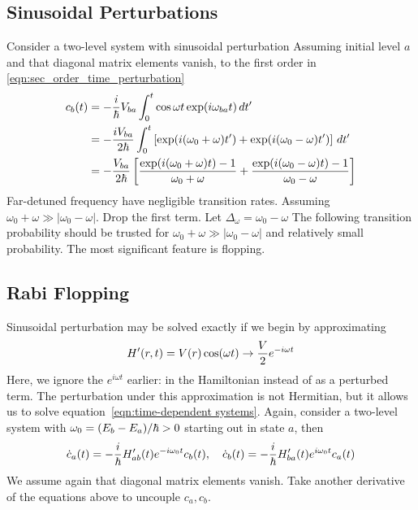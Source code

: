 \subsection{Sinusoidal Perturbations}
Consider a two-level system with sinusoidal perturbation 
Assuming initial level $a$ and that diagonal matrix elements vanish, to 
the first order in \ref{eqn:sec_order_time_perturbation}
\[\begin{aligned}
    c_b(t) 
    &= -\dfrac i {\hbar} V_{ba}\int_0^t \cos\omega t \exp(i\omega_{ba}t)\, dt'\\ 
    &= -\dfrac {i V_{ba}}{2\hbar} \int_0^t \left[\exp(i(\omega_0 + \omega) t') + \exp(i(\omega_0 - \omega)t')\right]\, dt' \\ 
    &= -\dfrac {V_{ba}}{2\hbar}\left[\dfrac{\exp(i(\omega_0 + \omega)t) - 1}{\omega_0 + \omega} + \dfrac{\exp(i(\omega_0 - \omega)t) - 1}{\omega_0 - \omega}\right]
\end{aligned}\] 
Far-detuned frequency have negligible transition rates. Assuming $\omega_0 + \omega \gg |\omega_0 - \omega|$. 
Drop the first term. Let $\Delta_\omega = \omega_0 - \omega$ 
The following transition probability should be trusted for $\omega_0 + \omega \gg |\omega_0 - \omega|$ and 
relatively small probability. The most significant feature is flopping. 
\subsection{Rabi Flopping}
Sinusoidal perturbation may be solved exactly if we begin by approximating 
\[ 
    H'(r, t) = V(r)\cos(\omega t) \to \dfrac V 2 e^{-i\omega t}
\] 
Here, we ignore the $e^{i\omega t}$ earlier: in the Hamiltonian instead of as a perturbed term. 
The perturbation under this approximation is not Hermitian, but it allows us to solve 
equation~\ref{eqn:time-dependent systems}. 
Again, consider a two-level system with 
$\omega_0 = (E_b - E_a)/\hbar>0$ starting out in state $a$, then 
\[
    \dot c_a(t) = -\dfrac i {\hbar} H'_{ab}(t)e^{-i\omega_0 t} c_b(t)
    ,\quad \dot c_b(t) = -\dfrac i {\hbar} H'_{ba}(t)e^{i\omega_0 t}c_a(t)
\] 
We assume again that diagonal matrix elements vanish. 
Take another derivative of the equations above to uncouple $c_a, c_b$. 

